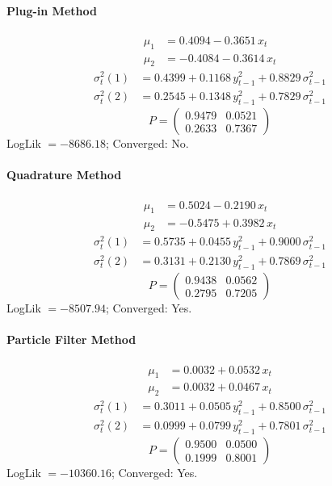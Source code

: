 \documentclass[11pt, a4paper]{article}
\begin{document}
\paragraph{Plug-in Method}
\begin{align}
\mu_{1} &= 0.4094 -0.3651\, x_t \\
\mu_{2} &= -0.4084 -0.3614\, x_t
\end{align}
\begin{align}
\sigma^2_{t}(1) &= 0.4399 + 0.1168\, y_{t-1}^2 + 0.8829\, \sigma^2_{t-1} \\
\sigma^2_{t}(2) &= 0.2545 + 0.1348\, y_{t-1}^2 + 0.7829\, \sigma^2_{t-1}
\end{align}
\begin{equation}
P = \begin{pmatrix} 0.9479 & 0.0521 \\ 0.2633 & 0.7367 \end{pmatrix}
\end{equation}
LogLik $= -8686.18$; Converged: No.

\paragraph{Quadrature Method}
\begin{align}
\mu_{1} &= 0.5024 -0.2190\, x_t \\
\mu_{2} &= -0.5475 + 0.3982\, x_t
\end{align}
\begin{align}
\sigma^2_{t}(1) &= 0.5735 + 0.0455\, y_{t-1}^2 + 0.9000\, \sigma^2_{t-1} \\
\sigma^2_{t}(2) &= 0.3131 + 0.2130\, y_{t-1}^2 + 0.7869\, \sigma^2_{t-1}
\end{align}
\begin{equation}
P = \begin{pmatrix} 0.9438 & 0.0562 \\ 0.2795 & 0.7205 \end{pmatrix}
\end{equation}
LogLik $= -8507.94$; Converged: Yes.

\paragraph{Particle Filter Method}
\begin{align}
\mu_{1} &= 0.0032 + 0.0532\, x_t \\
\mu_{2} &= 0.0032 + 0.0467\, x_t
\end{align}
\begin{align}
\sigma^2_{t}(1) &= 0.3011 + 0.0505\, y_{t-1}^2 + 0.8500\, \sigma^2_{t-1} \\
\sigma^2_{t}(2) &= 0.0999 + 0.0799\, y_{t-1}^2 + 0.7801\, \sigma^2_{t-1}
\end{align}
\begin{equation}
P = \begin{pmatrix} 0.9500 & 0.0500 \\ 0.1999 & 0.8001 \end{pmatrix}
\end{equation}
LogLik $= -10360.16$; Converged: Yes.
\end{document}
